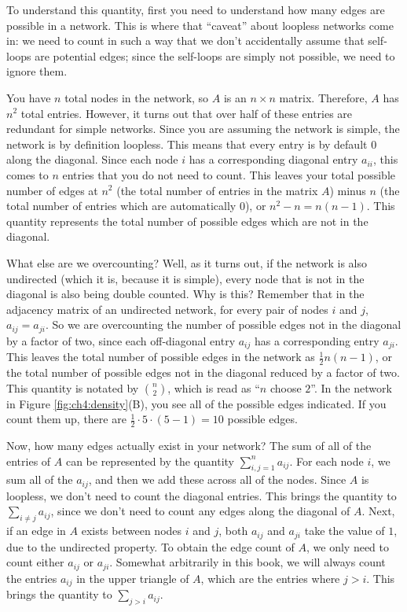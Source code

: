 To understand this quantity, first you need to understand how many edges are possible in a network. This is where that ``caveat'' about loopless networks come in: we need to count in such a way that we don't accidentally assume that self-loops are potential edges; since the self-loops are simply not possible, we need to ignore them. 

You have $n$ total nodes in the network, so $A$ is an $n \times n$ matrix. Therefore, $A$ has $n^2$ total entries. However, it turns out that over {half} of these entries are redundant for simple networks. Since you are assuming the network is simple, the network is by definition loopless. This means that every entry is {by default} $0$ along the diagonal. Since each node $i$ has a corresponding diagonal entry $a_{ii}$, this comes to $n$ entries that you do not need to count. This leaves your total possible number of edges at $n^2$ (the total number of entries in the matrix $A$) minus $n$ (the total number of entries which are automatically $0$), or $n^2 - n = n(n - 1)$. This quantity represents the total number of possible edges which are {not} in the diagonal.

What else are we overcounting? Well, as it turns out, if the network is also {undirected} (which it is, because it is {simple}), every node that is {not} in the diagonal is also being double counted. Why is this? Remember that in the adjacency matrix of an undirected network, for every pair of nodes $i$ and $j$, $a_{ij} = a_{ji}$. So we are overcounting the number of possible edges not in the diagonal by a factor of {two}, since each off-diagonal entry $a_{ij}$ has a corresponding entry $a_{ji}$. This leaves the total number of possible edges in the network as $\frac{1}{2}n(n - 1)$, or the total number of possible edges not in the diagonal reduced by a factor of two. This quantity is notated by $\binom n 2$, which is read as ``$n$ {choose} $2$''. In the network in Figure \ref{fig:ch4:density}(B), you see all of the {possible} edges indicated. If you count them up, there are $\frac{1}{2}\cdot 5 \cdot (5 - 1) = 10$ possible edges.

Now, how many edges {actually} exist in your network? The sum of all of the entries of $A$ can be represented by the quantity $\sum_{i , j= 1}^n a_{ij}$. For each node $i$, we sum all of the $a_{ij}$, and then we add these across all of the nodes. Since $A$ is loopless, we don't need to count the diagonal entries. This brings the quantity to $\sum_{i \neq j}a_{ij}$, since we don't need to count any edges along the diagonal of $A$. Next, if an edge in $A$ exists between nodes $i$ and $j$, {both} $a_{ij}$ and $a_{ji}$ take the value of $1$, due to the undirected property. To obtain the edge count of $A$, we only need to count {either} $a_{ij}$ {or} $a_{ji}$. Somewhat arbitrarily in this book, we will always count the entries $a_{ij}$ in the upper triangle of $A$, which are the entries where $j > i$. This brings the quantity to $\sum_{j > i} a_{ij}$. 


